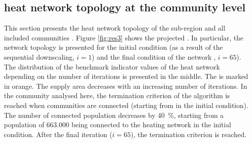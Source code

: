 \subsection{ heat network topology at the community level}\label{res:4}
This section presents the  heat network topology of the sub-region  and all included communities .  Figure \ref{fig:res3} shows the projected . In particular, the network topology is presented for the initial condition (as a result of the sequential downscaling, $i=1$) and the final condition of the network , $i=65$). The distribution of the benchmark indicator values of the  heat network depending on the number of iterations is presented in the middle. The  is marked in orange. The supply area decreases with an increasing number of iterations. In the community analysed here, the termination criterion of the algorithm is reached when  communities are connected (starting from  in the initial condition). The number of connected population decreases by \SI{40}{\%}, starting from a population of \SI{663,000}{} being connected  to the  heating network in the initial condition. After the final iteration ($i=65$), the termination criterion is reached. 

